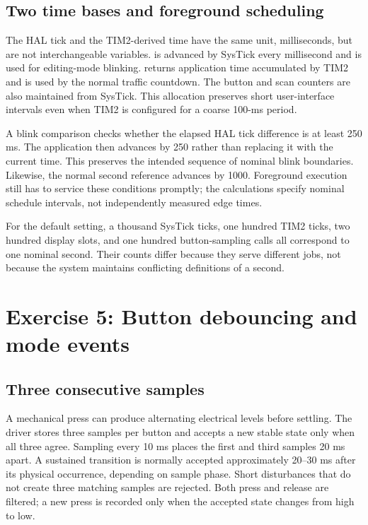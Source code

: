 \documentclass[a4paper]{article}
\newcommand{\code}[1]{\texttt{\detokenize{#1}}}
\newcommand{\topic}[1]{\subsection{#1}}
\begin{document}
\topic{Two time bases and foreground scheduling}

The HAL tick and the TIM2-derived time have the same unit, milliseconds, but
are not interchangeable variables. \code{HAL_GetTick()} is advanced by SysTick
every millisecond and is used for editing-mode blinking. \code{timer_get_time()}
returns application time accumulated by TIM2 and is used by the normal traffic
countdown. The button and scan counters are also maintained from SysTick.
This allocation preserves short user-interface intervals even when TIM2 is
configured for a coarse 100-ms period.

A blink comparison checks whether the elapsed HAL tick difference is at least
250 ms. The application then advances \code{last_blink} by 250 rather than
replacing it with the current time. This preserves the intended sequence of
nominal blink boundaries. Likewise, the normal second reference advances by
1000. Foreground execution still has to service these conditions promptly;
the calculations specify nominal schedule intervals, not independently
measured edge times.

For the default setting, a thousand SysTick ticks, one hundred TIM2 ticks,
two hundred display slots, and one hundred button-sampling calls all correspond
to one nominal second. Their counts differ because they serve different jobs,
not because the system maintains conflicting definitions of a second.


\clearpage
\section{Exercise 5: Button debouncing and mode events}

\topic{Three consecutive samples}
A mechanical press can produce alternating electrical levels before settling.
The driver stores three samples per button and accepts a new stable state only
when all three agree. Sampling every 10 ms places the first and third samples
20 ms apart. A sustained transition is normally accepted approximately
20--30 ms after its physical occurrence, depending on sample phase.
Short disturbances that do not create three matching samples are rejected.
Both press and release are filtered; a new press is recorded only when the
accepted state changes from high to low.
\end{document}
